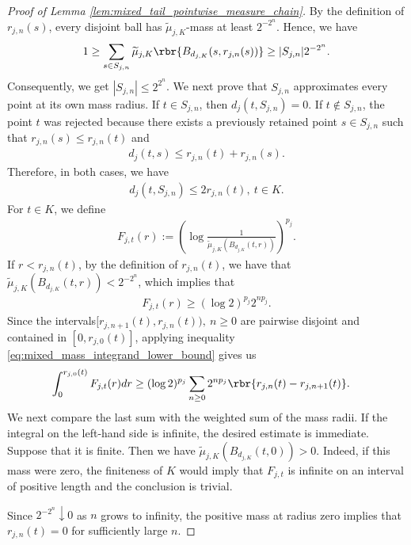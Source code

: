 \documentclass[11pt]{article}
\begin{document}
\begin{proof}[Proof of Lemma
\ref{lem:mixed_tail_pointwise_measure_chain}]
By the definition of $r_{j,n}(s)$, every disjoint ball
has $\widetilde\mu_{j,K}$-mass at least $2^{-2^n}$. Hence, we have
\begin{align*}
1\ge
\sum_{s\in S_{j,n}}
\widetilde\mu_{j,K}
\rbr{B_{d_{j,K}}(s,r_{j,n}(s))}\ge
|S_{j,n}|2^{-2^n}.
\end{align*}
Consequently, we get $|S_{j,n}|
\le
2^{2^n}$. We next prove that $S_{j,n}$ approximates every point at its own mass
radius. If $t\in S_{j,n}$, then
$d_j(t,S_{j,n})=0$. If $t\notin S_{j,n}$, the point $t$ was rejected
because there exists a previously retained point $s\in S_{j,n}$ such
that $r_{j,n}(s)\le r_{j,n}(t)$ and
\begin{align*}
d_j(t,s)
\le
r_{j,n}(t)+r_{j,n}(s).
\end{align*}
Therefore, in both cases, we have
\begin{align}
d_j(t,S_{j,n})
\le
2r_{j,n}(t),
\ t\in K.
\label{eq:mixed_mass_net_approximation}
\end{align}
For $t\in K$, we define
\begin{align*}
F_{j,t}(r)
:=
\left(
\log\frac{1}{
\widetilde\mu_{j,K}(B_{d_{j,K}}(t,r))
}
\right)^{p_j}.
\end{align*}
If $r<r_{j,n}(t)$, by the definition of
$r_{j,n}(t)$, we have that $\widetilde\mu_{j,K}(B_{d_{j,K}}(t,r))
<
2^{-2^n}$, which implies that
\begin{align}
F_{j,t}(r)
\ge
(\log2)^{p_j}2^{np_j}.
\label{eq:mixed_mass_integrand_lower_bound}
\end{align}
Since the intervals$[r_{j,n+1}(t),r_{j,n}(t)),
\ n\ge0$ are pairwise disjoint and contained in
$[0,r_{j,0}(t)]$, applying inequality
\eqref{eq:mixed_mass_integrand_lower_bound} gives us
\begin{align}
\int_0^{r_{j,0}(t)}F_{j,t}(r)dr
&\ge
(\log2)^{p_j}
\sum_{n\ge0}
2^{np_j}
\rbr{r_{j,n}(t)-r_{j,n+1}(t)}.
\label{eq:mixed_mass_integral_radius_differences}
\end{align}
We next compare the last sum with the weighted sum of the mass radii.
If the integral on the left-hand side is infinite, the desired
estimate is immediate. Suppose that it is finite. Then we have $\widetilde\mu_{j,K}(B_{d_{j,K}}(t,0))>0$. 
Indeed, if this mass were zero, the finiteness of $K$ would imply that
$F_{j,t}$ is infinite on an interval of positive length and the conclusion is trivial. 

Since $2^{-2^n}\downarrow0$ as $n$ grows to infinity, the positive mass at radius zero implies that
$r_{j,n}(t)=0$ for sufficiently large $n$.


\end{proof}
\end{document}
